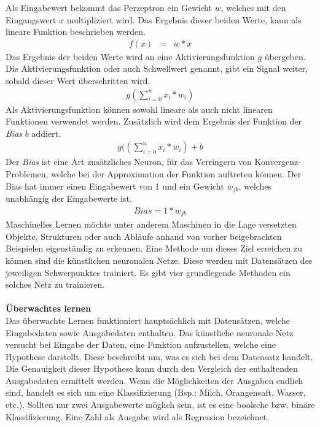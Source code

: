 Als Eingabewert bekommt das Perzeptron ein Gewicht $w$, welches mit den Eingangswert $x$ multipliziert wird. Das Ergebnis dieser beiden Werte, kann als lineare Funktion beschrieben werden.
\begin{eqnarray} f(x) & = & w*x \end{eqnarray}
Das Ergebnis der beiden Werte wird an eine Aktivierungsfunktion $g$ übergeben. Die Aktivierungsfunktion oder auch Schwellwert genannt, gibt ein Signal weiter, sobald dieser Wert überschritten wird.
\begin{eqnarray} g( \sum_{i=0}^n x_{i} *w_{i}) \end{eqnarray}
Als Aktivierungsfunktion können sowohl lineare als auch nicht linearen Funktionen verwendet werden. Zusätzlich wird dem Ergebnis der Funktion der \textit{Bias} $b$ addiert.
\begin{eqnarray} g(( \sum_{i=0}^n x_{i} *w_{i}) +b \end{eqnarray}
Der \textit{Bias} ist eine Art zusätzliches Neuron, für das Verringern von Konvergenz-Problemen, welche bei der Approximation der Funktion auftreten können. Der Bias hat immer einen Eingabewert von 1 und ein Gewicht $w_{jb}$, welches unabhängig der Eingabewerte ist.
\begin{eqnarray} Bias = 1*w_{jb} \end{eqnarray}
Maschinelles Lernen möchte unter anderem Maschinen in die Lage versetzten Objekte, Strukturen oder auch Abläufe anhand von vorher beigebrachten Beispielen eigenständig zu erkennen. Eine Methode um dieses Ziel erreichen zu können sind die künstlichen neuronalen Netze. Diese werden mit Datensätzen des jeweiligen Schwerpunktes trainiert. Es gibt vier grundlegende Methoden ein solches Netz zu trainieren.\\\\
\textbf{Überwachtes lernen}\\
Das überwachte Lernen funktioniert hauptsächlich mit Datensätzen, welche Eingabedaten sowie Ausgabedaten enthalten. Das künstliche neuronale Netz versucht bei Eingabe der Daten, eine Funktion aufzustellen, welche eine Hypothese darstellt. Diese beschreibt um, was es sich bei dem Datensatz handelt. Die Genauigkeit dieser Hypothese kann durch den Vergleich der enthaltenden Ausgabedaten ermittelt werden. Wenn die Möglichkeiten der Ausgaben endlich sind, handelt es sich um eine Klassifizierung (Bsp.: Milch, Orangensaft, Wasser, etc.). Sollten nur zwei Ausgabewerte möglich sein, ist es eine boolsche bzw. binäre Klassifizierung. Eine Zahl als Ausgabe wird als Regression bezeichnet.\\\\
